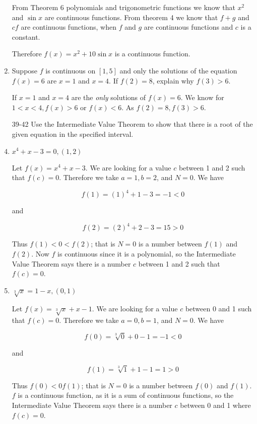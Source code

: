 \documentclass{article}
\begin{document}
\begin{enumerate}
			From Theorem 6 polynomials and trigonometric functions we know that $x^2$
			and $\sin x$ are continuous functions. From theorem 4 we know that 
			$f + g$ and $cf$ are continuous functions, when $f$ and $g$ are continuous
			functions and $c$ is a constant.

			Therefore $f(x) = x^2 + 10\sin x$ is a continuous function.	

			\item Suppose $f$ is continuous on $[1,5]$ and only the solutions of the equation
				$f(x) = 6$ are $x = 1$ and $x = 4$. If $f(2) = 8$, explain why $f(3) > 6$.

				If $x = 1$ and $x = 4$ are the \emph{only} solutions of $f(x) = 6$. We know for 
				$1 < x < 4, f(x) > 6 \text{ or } f(x) < 6$. As $f(2) = 8, f(3) > 6$.

			\item[39-42] Use the Intermediate Value Theorem to show that there is a root of the
				given equation in the specified interval.

			\item $x^4 + x - 3 = 0, (1,2)$

				Let $f(x) = x^4 + x - 3$. We are looking for a value $c$ between 1 and 2
				such that $f(c) = 0$. Therefore we take $a = 1, b = 2$, and $N = 0$. We
				have

				$$f(1) = (1)^4 + 1 - 3 = -1 < 0$$

				and

				$$f(2) = (2)^4 + 2 - 3 = 15 > 0$$

				Thus $f(1) < 0 < f(2)$; that is $N = 0$ is a number between $f(1)$ and
				$f(2)$. Now $f$ is continuous since it is a polynomial, so the Intermediate
				Value Theorem says there is a number $c$ between 1 and 2 such that
				$f(c) = 0$.

			\item $\sqrt[3]{x} = 1 - x, (0, 1)$

				Let $f(x) = \sqrt[3]{x} + x - 1$. We are looking for a value $c$ between
				0 and 1 such that $f(c) = 0$. Therefore we take $a = 0, b = 1$, and $N = 0$.
				We have

				$$f(0) = \sqrt[3]{0} + 0 - 1 = -1 < 0$$

				and

				$$f(1) = \sqrt[3]{1} + 1 - 1 = 1 > 0$$

				Thus $f(0) < 0 f(1)$; that is $N = 0$ is a number between $f(0)$ and $f(1)$.
				$f$ is a continuous function, as it is a sum of continuous functions, so the
				Intermediate Value Theorem says there is a number $c$ between 0 and 1 where
				$f(c) = 0$.


\end{enumerate}
\end{document}
